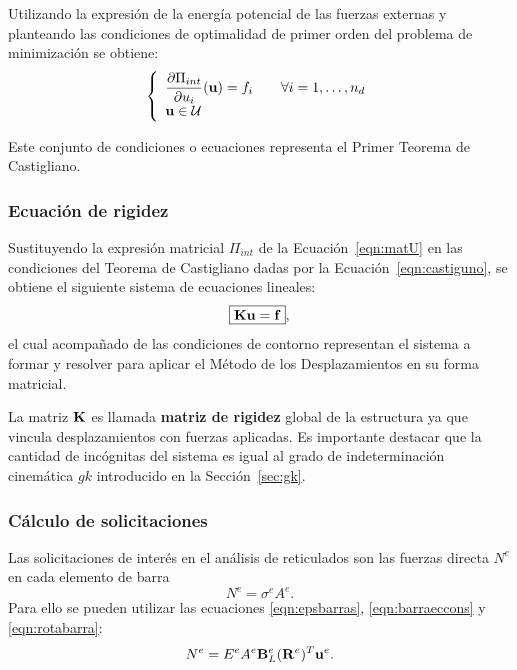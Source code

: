Utilizando la expresión de la energía potencial de las fuerzas externas y planteando las condiciones de optimalidad de primer orden del problema de minimización se obtiene:
%
\begin{equation}\label{eqn:castiguno}
\left\{ 
\begin{array}{l}
\displaystyle  \frac{\partial \Pi_{int} }{ \partial u_i}({\bf u}) = f_i \qquad \forall i=1,\dots, n_d\\
  {\bf u} \in {\mathcal U}
\end{array}
  \right.
\end{equation}

Este conjunto de condiciones o ecuaciones representa el Primer Teorema de Castigliano. %
%





\subsubsection{ Ecuación de rigidez }

Sustituyendo la expresión matricial $\Pi_{int}$ de la Ecuación~\eqref{eqn:matU} en las condiciones del Teorema de Castigliano dadas por la Ecuación~\eqref{eqn:castiguno}, se obtiene el siguiente sistema de ecuaciones lineales:
%
\begin{equation}
\boxed{
	{\bf K} {\bf u} = {\bf f}
},
\end{equation}
%
el cual acompañado de las condiciones de contorno representan el sistema a formar y resolver para aplicar el Método de los Desplazamientos en su forma matricial. %

La matriz ${\bf K}$ es llamada \textbf{matriz de rigidez} global de la estructura ya que vincula desplazamientos con fuerzas aplicadas. %
%
Es importante destacar que la cantidad de incógnitas del sistema es igual al grado de indeterminación cinemática $gk$ introducido en la Sección~\ref{sec:gk}.

	\subsubsection{Cálculo de solicitaciones}

Las solicitaciones de interés en el análisis de reticulados son las fuerzas directa $N^e$ en cada elemento de barra
%
\begin{equation}
N^e = \sigma^e A^e.
\end{equation}
%
Para ello se pueden utilizar las ecuaciones \eqref{eqn:epsbarras}, \eqref{eqn:barraeccons} y \eqref{eqn:rotabarra}:
%
\begin{equation}\label{eqn:expSolic}
N^e = E^e A^e {\bf B}_L^e ({\bf R}^e)^T {\bf u}^e.
\end{equation}


